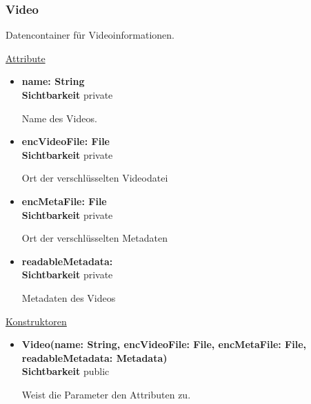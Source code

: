 \subsubsection{Video} \label{app:klasse:Video}
Datencontainer für Videoinformationen. \newline

\underline{Attribute}
\begin{itemize}
\itemsep0pt
\item \textbf{name: String} \hfill\\ 
\textbf{Sichtbarkeit} private

Name des Videos.

\item \textbf{encVideoFile: File} \hfill\\ 
\textbf{Sichtbarkeit} private

Ort der verschlüsselten Videodatei

\item \textbf{encMetaFile: File} \hfill\\ 
\textbf{Sichtbarkeit} private

Ort der verschlüsselten Metadaten

\item \textbf{readableMetadata: } \hfill\\ 
\textbf{Sichtbarkeit} private

Metadaten des Videos
\end{itemize}

\underline{Konstruktoren}
\begin{itemize}
\itemsep0pt
\item \textbf{Video(name: String, encVideoFile: File, encMetaFile: File, readableMetadata: Metadata)} \hfill\\
\textbf{Sichtbarkeit} public

Weist die Parameter den Attributen zu.

\end{itemize}